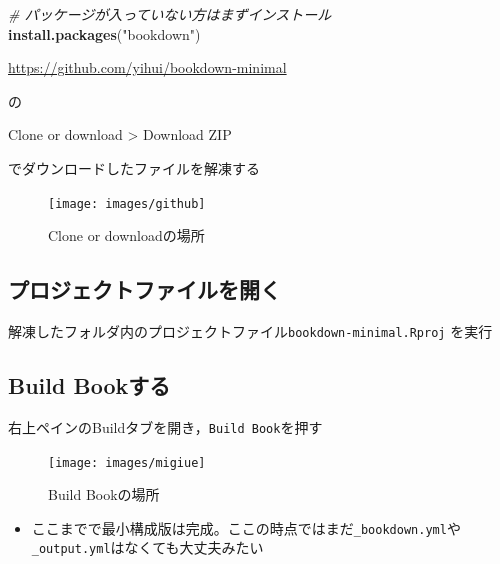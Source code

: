 \documentclass[xelatex,ja=standard]{bxjsbook}
\newenvironment{Shaded}{\begin{snugshade}}{\end{snugshade}}
\newcommand{\CommentTok}[1]{\textcolor[rgb]{0.56,0.35,0.01}{\textit{#1}}}
\newcommand{\KeywordTok}[1]{\textcolor[rgb]{0.13,0.29,0.53}{\textbf{#1}}}
\newcommand{\NormalTok}[1]{#1}
\newcommand{\StringTok}[1]{\textcolor[rgb]{0.31,0.60,0.02}{#1}}
\providecommand{\tightlist}{%
  \setlength{\itemsep}{0pt}\setlength{\parskip}{0pt}}
\begin{document}
\begin{Shaded}
\begin{Highlighting}[]
\CommentTok{# パッケージが入っていない方はまずインストール}
\KeywordTok{install.packages}\NormalTok{(}\StringTok{"bookdown"}\NormalTok{)}
\end{Highlighting}
\end{Shaded}

\url{https://github.com/yihui/bookdown-minimal}

の

Clone or download \textgreater{} Download ZIP

でダウンロードしたファイルを解凍する



\begin{figure}

{\centering \texttt{[image: images/github]} 

}

\caption{Clone or downloadの場所}\label{fig:github}
\end{figure}

\hypertarget{hajime_open}{%
\subsection*{プロジェクトファイルを開く}\label{hajime_open}}

解凍したフォルダ内のプロジェクトファイル\texttt{bookdown-minimal.Rproj} を実行

\hypertarget{hajime_bb}{%
\subsection*{Build Bookする}\label{hajime_bb}}

右上ペインのBuildタブを開き，\texttt{Build\ Book}を押す



\begin{figure}

{\centering \texttt{[image: images/migiue]} 

}

\caption{Build Bookの場所}\label{fig:migiue}
\end{figure}

\begin{itemize}
\tightlist
\item
  ここまでで最小構成版は完成。ここの時点ではまだ\texttt{\_bookdown.yml}や\texttt{\_output.yml}はなくても大丈夫みたい
\end{itemize}
\end{document}
